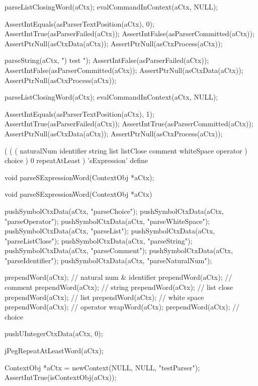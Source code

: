   parseListClosingWord(aCtx);
  evalCommandInContext(aCtx, NULL);
  
  AssertIntEquals(asParserTextPosition(aCtx), 0);
  AssertIntTrue(asParserFailed(aCtx));
  AssertIntFalse(asParserCommitted(aCtx));
  AssertPtrNull(asCtxData(aCtx));
  AssertPtrNull(asCtxProcess(aCtx));  
\stopCTest
\stopTestCase

\startCTest
  parseString(aCtx, ") test ");
  AssertIntFalse(asParserFailed(aCtx));
  AssertIntFalse(asParserCommitted(aCtx));
  AssertPtrNull(asCtxData(aCtx));
  AssertPtrNull(asCtxProcess(aCtx));
  
  parseListClosingWord(aCtx);
  evalCommandInContext(aCtx, NULL);
  
  AssertIntEquals(asParserTextPosition(aCtx), 1);
  AssertIntTrue(asParserFailed(aCtx));
  AssertIntTrue(asParserCommitted(aCtx));
  AssertPtrNull(asCtxData(aCtx));
  AssertPtrNull(asCtxProcess(aCtx));
\stopCTest
\stopTestCase
\stopTestSuite

\startTestSuite[parseSExpressionWord]

\starttyping
(
  (
    (
      naturalNum
      identifier
      string
      list
      listClose
      comment
      whiteSpace
      operator
    ) choice
  ) 0 repeatAtLeast
) 'sExpression' define
\stoptyping

\startCHeader
void parseSExpressionWord(ContextObj *aCtx);
\stopCHeader

\startCCode
void parseSExpressionWord(ContextObj *aCtx) {

  pushSymbolCtxData(aCtx, "parseChoice");
  pushSymbolCtxData(aCtx, "parseOperator");
  pushSymbolCtxData(aCtx, "parseWhiteSpace");
  pushSymbolCtxData(aCtx, "parseList");
  pushSymbolCtxData(aCtx, "parseListClose");
  pushSymbolCtxData(aCtx, "parseString");
  pushSymbolCtxData(aCtx, "parseComment");
  pushSymbolCtxData(aCtx, "parseIdentifier");
  pushSymbolCtxData(aCtx, "parseNaturalNum");
  
  prependWord(aCtx); // natural num & identifier
  prependWord(aCtx); // comment
  prependWord(aCtx); // string
  prependWord(aCtx); // list close
  prependWord(aCtx); // list
  prependWord(aCtx); // white space
  prependWord(aCtx); // operator
  wrapWord(aCtx);
  prependWord(aCtx); // choice

  pushUIntegerCtxData(aCtx, 0);

  jPegRepeatAtLeastWord(aCtx);
}
\stopCCode

\startCTest
  ContextObj *aCtx = newContext(NULL, NULL, "testParser");
  AssertIntTrue(isContextObj(aCtx));
  
